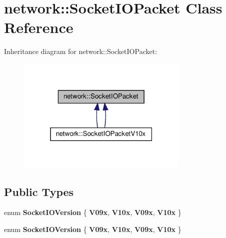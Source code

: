 \hypertarget{classnetwork_1_1SocketIOPacket}{}\section{network\+:\+:Socket\+I\+O\+Packet Class Reference}
\label{classnetwork_1_1SocketIOPacket}


Inheritance diagram for network\+:\+:Socket\+I\+O\+Packet\+:
\nopagebreak
\begin{figure}[H]
\begin{center}
\leavevmode
\includegraphics[width=232pt]{classnetwork_1_1SocketIOPacket__inherit__graph}
\end{center}
\end{figure}
\subsection*{Public Types}
\begin{DoxyCompactItemize}
\item 
\mbox{\label{classnetwork_1_1SocketIOPacket_a8497d71850c82e64929fe1282e789fde}} 
enum {\bfseries Socket\+I\+O\+Version} \{ {\bfseries V09x}, 
{\bfseries V10x}, 
{\bfseries V09x}, 
{\bfseries V10x}
 \}
\item 
\mbox{\label{classnetwork_1_1SocketIOPacket_a8497d71850c82e64929fe1282e789fde}} 
enum {\bfseries Socket\+I\+O\+Version} \{ {\bfseries V09x}, 
{\bfseries V10x}, 
{\bfseries V09x}, 
{\bfseries V10x}
 \}
\end{DoxyCompactItemize}
